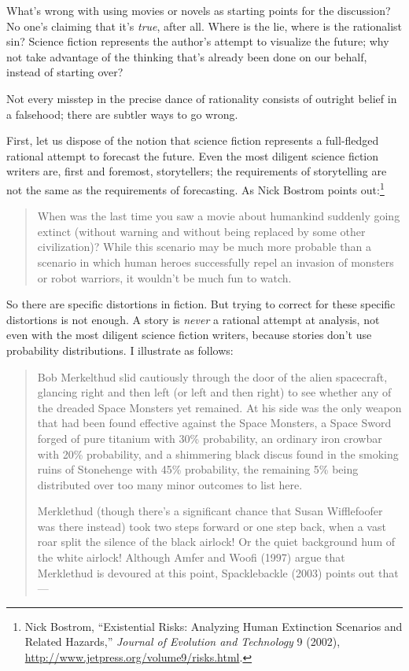{
 What's wrong with using movies or novels as
starting points for the discussion? No one's claiming
that it's \textit{true}, after all. Where is the lie,
where is the rationalist sin? Science fiction represents the
author's attempt to visualize the future; why not take
advantage of the thinking that's already been done on
our behalf, instead of starting over?}

{
 Not every misstep in the precise dance of rationality consists of
outright belief in a falsehood; there are subtler ways to go wrong.}

{
 First, let us dispose of the notion that science fiction
represents a full-fledged rational attempt to forecast the future. Even
the most diligent science fiction writers are, first and foremost,
storytellers; the requirements of storytelling are not the same as the
requirements of forecasting. As Nick Bostrom points
out:\footnote{Nick Bostrom, ``Existential Risks: Analyzing
Human Extinction Scenarios and Related Hazards,''
\textit{Journal of Evolution and Technology} 9 (2002),
\url{http://www.jetpress.org/volume9/risks.html}.}}

\begin{quote}
{
 When was the last time you saw a movie about humankind suddenly
going extinct (without warning and without being replaced by some other
civilization)? While this scenario may be much more probable than a
scenario in which human heroes successfully repel an invasion of
monsters or robot warriors, it wouldn't be much fun to
watch.}
\end{quote}

{
 So there are specific distortions in fiction. But trying to
correct for these specific distortions is not enough. A story is
\textit{never} a rational attempt at analysis, not even with the most
diligent science fiction writers, because stories don't
use probability distributions. I illustrate as follows:}

\begin{quotation}
{
 Bob Merkelthud slid cautiously through the door of the alien
spacecraft, glancing right and then left (or left and then right) to
see whether any of the dreaded Space Monsters yet remained. At his side
was the only weapon that had been found effective against the Space
Monsters, a Space Sword forged of pure titanium with 30\% probability,
an ordinary iron crowbar with 20\% probability, and a shimmering black
discus found in the smoking ruins of Stonehenge with 45\% probability,
the remaining 5\% being distributed over too many minor outcomes to
list here.}

{
 Merklethud (though there's a significant chance
that Susan Wifflefoofer was there instead) took two steps forward or
one step back, when a vast roar split the silence of the black airlock!
Or the quiet background hum of the white airlock! Although Amfer and
Woofi (1997) argue that Merklethud is devoured at this point,
Spacklebackle (2003) points out that---}
\end{quotation}

